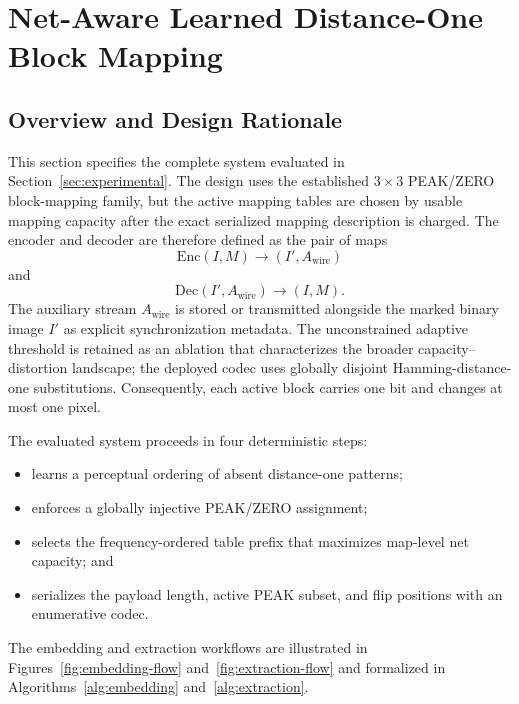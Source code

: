 \documentclass[a4paper,fleqn]{cas-dc}
\begin{document}
\section{Net-Aware Learned Distance-One Block Mapping}
\label{sec:proposedmethod}

\subsection{Overview and Design Rationale}

This section specifies the complete system evaluated in
Section~\ref{sec:experimental}. The design uses the established
$3\times3$ PEAK/ZERO block-mapping family, but the active mapping tables are
chosen by usable mapping capacity after the exact serialized mapping description is
charged. The encoder and decoder are therefore defined as the pair of maps
\begin{equation}
\mathrm{Enc}(I,M)\rightarrow(I',A_{\mathrm{wire}})
\label{eq:encoder-contract}
\end{equation}
and
\begin{equation}
\mathrm{Dec}(I',A_{\mathrm{wire}})\rightarrow(I,M).
\label{eq:decoder-contract}
\end{equation}
The auxiliary stream $A_{\mathrm{wire}}$ is stored or transmitted alongside the
marked binary image $I'$ as explicit synchronization metadata. The
unconstrained adaptive threshold is retained as an ablation that characterizes
the broader capacity--distortion landscape; the deployed codec uses globally
disjoint Hamming-distance-one substitutions. Consequently, each active block
carries one bit and changes at most one pixel.

The evaluated system proceeds in four deterministic steps:
\begin{itemize}
    \item learns a perceptual ordering of absent distance-one patterns;
    \item enforces a globally injective PEAK/ZERO assignment;
    \item selects the frequency-ordered table prefix that maximizes map-level
    net capacity; and
    \item serializes the payload length, active PEAK subset, and flip positions
    with an enumerative codec.
\end{itemize}

The embedding and extraction workflows are illustrated in
Figures~\ref{fig:embedding-flow} and~\ref{fig:extraction-flow} and formalized
in Algorithms~\ref{alg:embedding} and~\ref{alg:extraction}.
\end{document}

